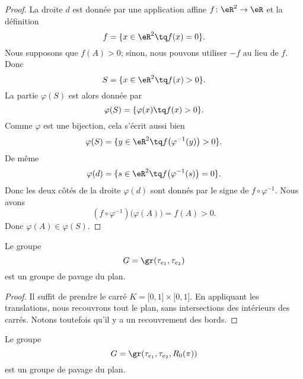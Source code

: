 \begin{proof}
    La droite \( d\) est donnée par une application affine \( f\colon \eR^2\to \eR\) et la définition
    \begin{equation}
        f=\{ x\in \eR^2\tq f(x)=0 \}.
    \end{equation}
    Nous supposons que \( f(A)>0\); sinon, nous pouvons utiliser \( -f\) au lieu de \( f\). Donc
    \begin{equation}
        S=\{ x\in \eR^2\tq f(x)>0 \}.
    \end{equation}
    La partie \( \varphi(S)\) est alors donnée par
    \begin{equation}
        \varphi(S)=\{ \varphi(x)\tq f(x)>0 \}.
    \end{equation}
    Comme \( \varphi\) est une bijection, cela s'écrit aussi bien
    \begin{equation}
        \varphi(S)=\{ y\in \eR^2\tq f\big( \varphi^{-1}(y) \big)>0 \}.
    \end{equation}
    De même
    \begin{equation}
        \varphi(d)=\{ s\in \eR^2\tq f\big( \varphi^{-1}(s) \big)=0 \}.
    \end{equation}
    Donc les deux côtés de la droite \( \varphi(d)\) sont donnés par le signe de \( f\circ \varphi^{-1}\). Nous avons
    \begin{equation}
        (f\circ\varphi^{-1})\big( \varphi(A) \big)=f(A)>0.
    \end{equation}
    Donc \( \varphi(A)\in \varphi(S)\).
\end{proof}

\begin{lemma}      
    Le groupe 
    \begin{equation}
        G=\gr(\tau_{e_1}, \tau_{e_2})
    \end{equation}
    est un groupe de pavage du plan.
\end{lemma}

\begin{proof}
    Il suffit de prendre le carré \( K=\mathopen[ 0 , 1 \mathclose]\times \mathopen[ 0 , 1 \mathclose]\). En appliquant les translations, nous recouvrons tout le plan, sans intersections des intérieurs des carrés. Notons toutefois qu'il y a un recouvrement des bords.
\end{proof}

\begin{lemma}    \label{LEMooTMRGooChBzZg}
    Le groupe 
    \begin{equation}
        G=\gr(\tau_{e_1}, \tau_{e_2}, R_0(\pi))
    \end{equation}
    est un groupe de pavage du plan.
\end{lemma}

